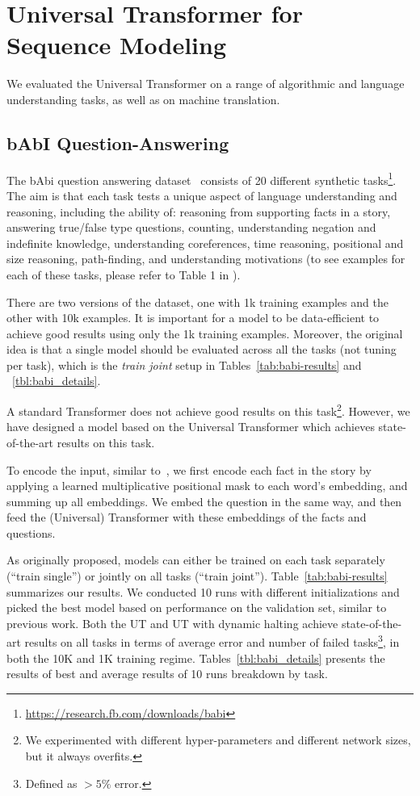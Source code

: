 \section{Universal Transformer for Sequence Modeling}
We evaluated the Universal Transformer on a range of algorithmic and language understanding tasks, as well as on machine translation. 

\subsection{bAbI Question-Answering}
The bAbi question answering dataset~\citep{weston2015towards} consists of 20 different synthetic tasks\footnote{\url{https://research.fb.com/downloads/babi}}. The aim is that each task tests a unique aspect of language understanding and reasoning, including the ability of: reasoning from supporting facts in a story, answering true/false type questions, counting, understanding negation and indefinite knowledge, understanding coreferences, time reasoning, positional and size reasoning, path-finding, and understanding motivations (to see examples for each of these tasks, please refer to Table 1 in \citep{weston2015towards}).

There are two versions of the dataset, one with 1k training examples and the other with 10k examples. It is important for a model to be data-efficient to achieve good results using only the 1k training examples. Moreover, the original idea is that a single model should be evaluated across all the tasks (not tuning per task), which is the \emph{train joint} setup in Tables~\ref{tab:babi-results} and ~\ref{tbl:babi_details}.

A standard Transformer does not achieve good results on this task\footnote{We experimented with different hyper-parameters and different network sizes, but it always overfits.}. However, we have designed a model based on the Universal Transformer which achieves state-of-the-art results on this task.

To encode the input, similar to~\cite{henaff2016tracking}, we first encode each fact in the story by applying a learned multiplicative positional mask to each word's embedding, and summing up all embeddings.
We embed the question in the same way, and then feed the (Universal) Transformer with these embeddings of the facts and questions. 

As originally proposed, models can either be trained on each task separately (``train single'') or jointly on all tasks (``train joint''). Table~\ref{tab:babi-results} summarizes our results. We conducted 10 runs with different initializations and picked the best model based on performance on the validation set, similar to previous work. Both the UT and UT with dynamic halting achieve state-of-the-art results on all tasks in terms of average error and number of failed tasks\footnote{Defined as $> 5\%$ error.}, in both the 10K and 1K training regime. Tables~\ref{tbl:babi_details} presents the results of best and average results of 10 runs breakdown by task.


